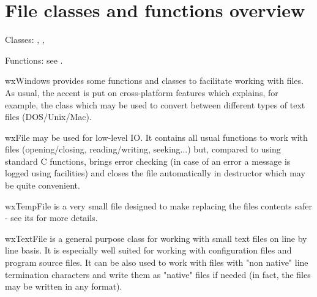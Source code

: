 \section{File classes and functions overview}\label{wxfileoverview}

Classes: , , 

Functions: see .

wxWindows provides some functions and classes to facilitate working with files.
As usual, the accent is put on cross-platform features which explains, for
example, the  class which may be used to convert
between different types of text files (DOS/Unix/Mac).

wxFile may be used for low-level IO. It contains all usual functions to work
with files (opening/closing, reading/writing, seeking...) but, compared to
using standard C functions, brings error checking (in case of an error a message
is logged using  facilities) and closes the file
automatically in destructor which may be quite convenient.

wxTempFile is a very small file designed to make replacing the files contents
safer - see its  for more details.

wxTextFile is a general purpose class for working with small text files on line
by line basis. It is especially well suited for working with configuration files
and program source files. It can be also used to work with files with "non
native" line termination characters and write them as "native" files if needed
(in fact, the files may be written in any format).

